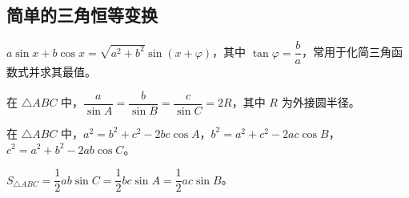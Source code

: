 \documentclass[lang=cn,newtx,10pt,scheme=chinese,nofont]{elegantbook}
\begin{document}
\subsection{简单的三角恒等变换}
\begin{definition}[辅助角公式]
$a\sin x+b\cos x=\sqrt{a^2+b^2}\sin(x+\varphi)$，其中 $\tan\varphi=\dfrac{b}{a}$，常用于化简三角函数式并求其最值。
\end{definition}
\begin{theorem}[正弦定理]
在 $\triangle ABC$ 中，$\dfrac{a}{\sin A}=\dfrac{b}{\sin B}=\dfrac{c}{\sin C}=2R$，其中 $R$ 为外接圆半径。
\end{theorem}
\begin{theorem}[余弦定理]
在 $\triangle ABC$ 中，$a^2=b^2+c^2-2bc\cos A$，$b^2=a^2+c^2-2ac\cos B$，$c^2=a^2+b^2-2ab\cos C$。
\end{theorem}
\begin{corollary}[三角形面积公式]
$S_{\triangle ABC}=\dfrac{1}{2}ab\sin C=\dfrac{1}{2}bc\sin A=\dfrac{1}{2}ac\sin B$。
\end{corollary}
\end{document}
